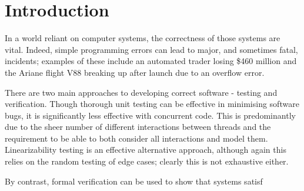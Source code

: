 \section{Introduction}


In a world reliant on computer systems, the correctness of those systems are vital. Indeed, simple programming errors can lead to major, and sometimes fatal, incidents; examples of these include an automated trader losing \$460 million\cite{} and the Ariane flight V88 breaking up after launch due to an overflow error\cite{Flight501Failure}.

There are two main approaches to developing correct software - testing and verification. Though thorough unit testing can be effective in minimising software bugs\cite{MicroTest}, it is significantly less effective with concurrent code. This is predominantly due to the sheer number of different interactions between threads and the requirement to be able to both consider all interactions and model them. Linearizability testing is an effective alternative approach, although again this relies on the random testing of edge cases; clearly this is not exhaustive either\cite{LoweLin}.

By contrast, formal verification can be used to show that systems satisf\cite{}

